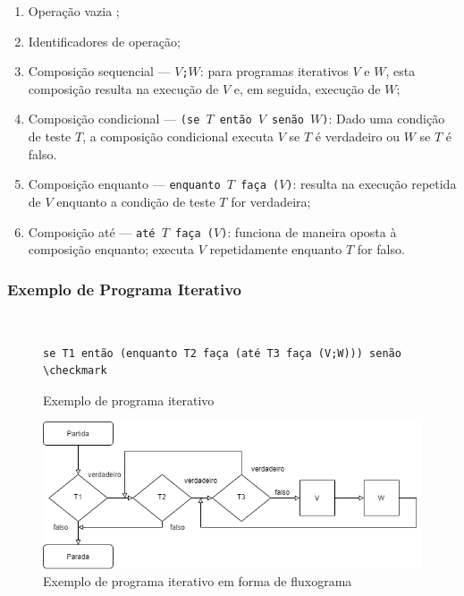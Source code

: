 \documentclass[12pt,fleqn]{article}
\begin{document}
\begin{enumerate}
    \item Operação vazia \checkmark;
    \item Identificadores de operação;
    \item Composição sequencial --- \texttt{$V$;$W$}: para programas iterativos
    $V$ e $W$, esta composição resulta na execução de $V$ e, em seguida,
    execução de $W$;
    \item Composição condicional --- \texttt{(se $T$ então $V$ senão $W$)}:
    Dado uma condição de teste $T$, a composição condicional executa $V$ se $T$
    é verdadeiro ou $W$ se $T$ é falso.
    \item Composição enquanto --- \texttt{enquanto $T$ faça  ($V$)}: resulta na
    execução repetida de $V$ enquanto a condição de teste $T$ for verdadeira;
    \item Composição até --- \texttt{até $T$ faça ($V$)}: funciona de maneira
    oposta à composição enquanto; executa $V$ repetidamente enquanto $T$ for
    falso.
\end{enumerate}

\subsubsection{Exemplo de Programa Iterativo}
~
\begin{figure}[H]
\begin{Verbatim}[commandchars=\\\{\},codes={\catcode`\$=3\catcode`\^=7}]
    se T1 então (enquanto T2 faça (até T3 faça (V;W))) senão \checkmark
\end{Verbatim}
\caption{Exemplo de programa iterativo}
\end{figure}

\begin{figure}[H]
    \includegraphics[width=\linewidth]{img/iterativo_ex}
    \caption{Exemplo de programa iterativo em forma de fluxograma}
\end{figure}
\end{document}
